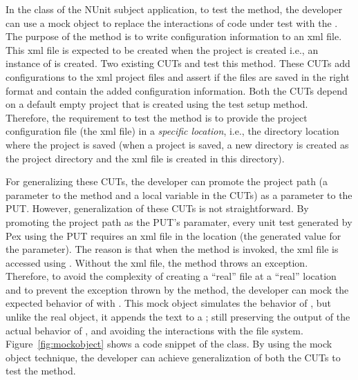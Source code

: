 In the  class of the NUnit subject application, to test the  method, the developer can use a mock object to replace the interactions of code under test with the . The purpose of the  method is to write configuration information to an xml file. This xml file is expected to be created when the project is created i.e., an instance of  is created. Two existing CUTs  and  test this  method. These CUTs add configurations to the xml project files and assert if the files are saved in the right format and contain the added configuration information. Both the CUTs depend on a default empty project that is created using the test setup method. Therefore, the requirement to test the  method is to provide the project configuration file (the xml file) in a \emph{specific location}, i.e., the directory location where the project is saved (when a project is saved, a new directory is created as the project directory and the xml file is created in this directory). 

For generalizing these CUTs, the developer can promote the project path (a parameter to the  method and a local variable in the CUTs) as a parameter to the PUT. However, generalization of these CUTs is not straightforward. By promoting the project path as the PUT's paramater, every unit test generated by Pex using the PUT requires an xml file in the location (the generated value for the parameter). The reason is that when the  method is invoked, the xml file is accessed using . Without the xml file, the  method throws an exception. Therefore, to avoid the complexity of creating a ``real'' file at a ``real'' location and to prevent the exception thrown by the  method, the developer can mock the expected behavior of  with . This mock object simulates the behavior of , but unlike the real object, it appends the text to a ; still preserving the output of the actual behavior of , and avoiding the interactions with the file system. Figure~\ref{fig:mockobject} shows a code snippet of the  class. By using the mock object technique, the developer can achieve generalization of both the CUTs to test the  method.


